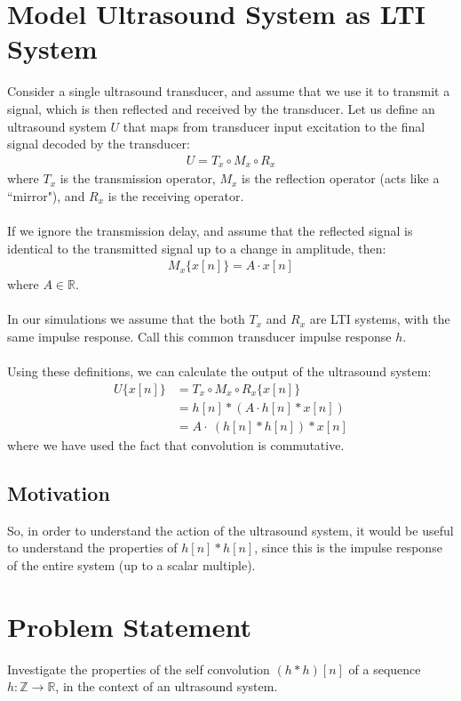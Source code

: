 \documentclass[a4paper]{article}
\newcommand{\op}[2]{#1\{#2\}}
\begin{document}
\section*{Model Ultrasound System as LTI System}
Consider a single ultrasound transducer, and assume that we use it to transmit a signal, which is then reflected and received by the transducer. Let us define an ultrasound system $U$ that maps from transducer input excitation to the final signal decoded by the transducer:
\begin{align*}
U = T_x \circ M_x \circ R_x
\end{align*}
where $T_x$ is the transmission operator, $M_x$ is the reflection operator (acts like a ``mirror"), and $R_x$  is the receiving operator.
\\\\
If we ignore the transmission delay, and assume that the reflected signal is identical to the transmitted signal up to a change in amplitude, then:
\begin{align*}
\op{M_x}{x[n]} = A \cdot x[n]
\end{align*}
where $A \in \mathbb{R}$.
\\\\
In our simulations we assume that the both $T_x$ and $R_x$ are LTI systems, with the same impulse response. Call this common transducer impulse response $h$. 
\\\\
Using these definitions, we can calculate the output of the ultrasound system:
\begin{align*}
\op{U}{x[n]} &= \op{T_x \circ M_x \circ R_x}{x[n]} \\
&= h[n] *(A \cdot h[n] * x[n]) \\
&= A \cdot \ (h[n] * h[n]) *x[n]
\end{align*}
where we have used the fact that convolution is commutative.
\clearpage
\subsection*{Motivation}
So, in order to understand the action of the ultrasound system, it would be useful to understand the properties of $h[n] * h[n]$, since this is the impulse response of the entire system (up to a scalar multiple).
\section*{Problem Statement}
Investigate the properties of  the self convolution $(h*h)[n]$ of a sequence $h: \mathbb{Z} \rightarrow \mathbb{R}$, in the context of an ultrasound system.
\end{document}
